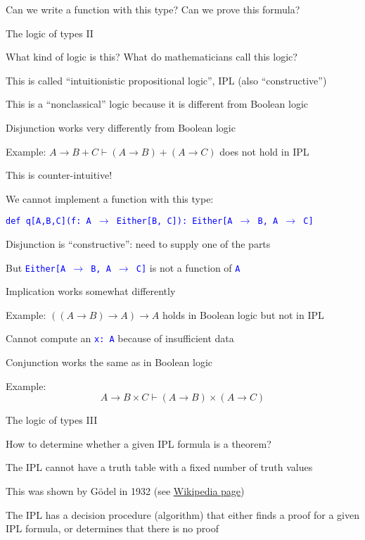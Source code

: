 Can we write a function with this type? Can we prove this formula?

The logic of types II

What kind of logic is this? What do mathematicians call this logic?

This is called ``intuitionistic propositional logic'', IPL (also
``constructive'')

This is a ``nonclassical'' logic because it is different from Boolean
logic

Disjunction works very differently from Boolean logic

Example: $A\rightarrow B+C\vdash(A\rightarrow B)+(A\rightarrow C)$
does not hold in IPL

This is counter-intuitive!

We cannot implement a function with this type:

\texttt{\textcolor{blue}{\footnotesize{}def q{[}A,B,C{]}(f: A $\rightarrow$
Either{[}B, C{]}): Either{[}A $\rightarrow$ B, A $\rightarrow$ C{]}}}{\footnotesize\par}

Disjunction is ``constructive'': need to supply one of the parts

But \texttt{\textcolor{blue}{\footnotesize{}Either{[}A $\rightarrow$
B, A $\rightarrow$ C{]}}} is not a function of \texttt{\textcolor{blue}{\footnotesize{}A}} 

Implication works somewhat differently

Example: $\left(\left(A\rightarrow B\right)\rightarrow A\right)\rightarrow A$
holds in Boolean logic but not in IPL

Cannot compute an \texttt{\textcolor{blue}{\footnotesize{}x:\ A}}
because of insufficient data

Conjunction works the same as in Boolean logic

Example: 
\[
A\rightarrow B\times C\vdash\left(A\rightarrow B\right)\times\left(A\rightarrow C\right)
\]
 

The logic of types III

How to determine whether a given IPL formula is a theorem?

The IPL cannot have a truth table with a fixed number of truth values

This was shown by G\"odel in 1932 (see \href{https://en.wikipedia.org/wiki/Many-valued_logic}{Wikipedia page})

The IPL has a decision procedure (algorithm) that either finds a proof
for a given IPL formula, or determines that there is no proof

